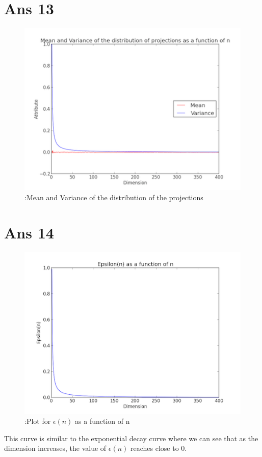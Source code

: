 \documentclass[10pt]{article}
\begin{document}
\begin{flushleft}
\begin{figure}[!htb]
\begin{floatrow}
    \end{floatrow}
\end{figure}
\end{flushleft}
\vspace{10em}
\section*{Ans 13}
\begin{flushleft}
\begin{figure}[!htb]
\includegraphics{13.png}
\caption{:Mean and Variance of the distribution of the projections}
\end{figure}
\end{flushleft}
\section*{Ans 14}
\begin{flushleft}
\begin{figure}[!htb]
\includegraphics{14_2.png}
\caption{:Plot for $\epsilon(n)$ as a function of n}
\end{figure}
This curve is similar to the exponential decay curve where we can see that as the dimension increases, the value of $\epsilon(n)$ reaches close to 0.
\end{flushleft}
\end{document}
